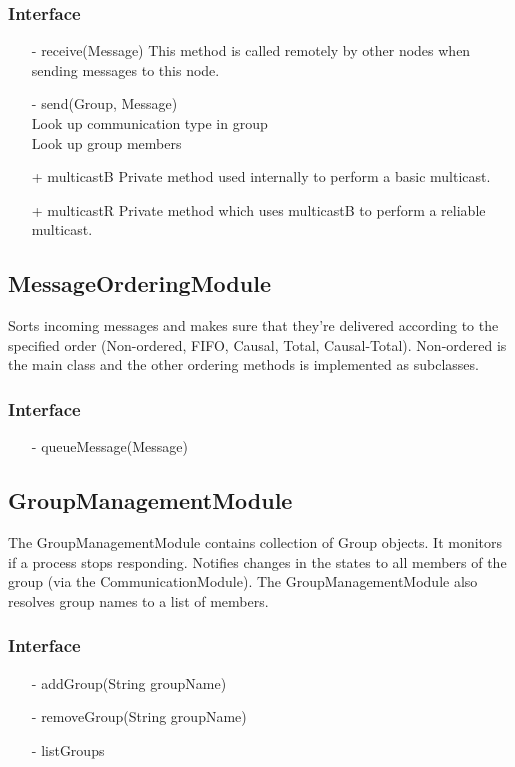 \documentclass[english]{article}
\begin{document}
\subsubsection{Interface}
\begin{itemize}
\item[-] receive(Message)
	This method is called remotely by other nodes when sending messages to this node.

\item[-] send(Group, Message) \\
	Look up communication type in group \\
	Look up group members

\item[+] multicastB
	Private method used internally to perform a basic multicast.

\item[+] multicastR
	Private method which uses multicastB to perform a reliable multicast.

\end{itemize}

\subsection{MessageOrderingModule}
Sorts incoming messages and makes sure that they're delivered according to the specified order (Non-ordered, FIFO, Causal, Total, Causal-Total). Non-ordered is the main class and the other ordering methods is implemented as subclasses. 

\subsubsection{Interface}
\begin{itemize}
\item[-] queueMessage(Message)
\end{itemize}

\subsection{GroupManagementModule}
The GroupManagementModule contains collection of Group objects. It monitors if a process stops responding. Notifies changes in the states to all members of the group (via the CommunicationModule). The GroupManagementModule also resolves group names to a list of members.

\subsubsection{Interface}
\begin{itemize}
\item[-] addGroup(String groupName)
\item[-] removeGroup(String groupName)
\item[-] listGroups
\end{itemize}
\end{document}
